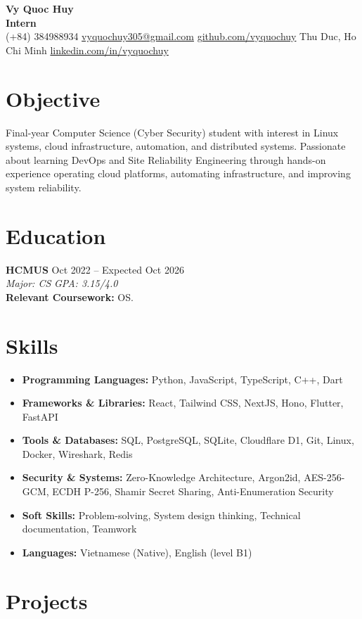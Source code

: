 \documentclass[10pt,a4paper]{article}
\begin{document}
\pagestyle{empty}

\begin{center}
    {\huge \textbf{Vy Quoc Huy}} \\ \vspace{4pt}
    {\Large \textbf{Intern}} \\ \vspace{4pt}
    (+84) 384988934 \quad \href{mailto:vyquochuy305@gmail.com}{vyquochuy305@gmail.com} \quad \href{https://github.com/vyquochuy}{github.com/vyquochuy} \quad Thu Duc, Ho Chi Minh \quad \href{https://www.linkedin.com/in/vyquochuy/}{linkedin.com/in/vyquochuy}
\end{center}

\section*{Objective}
Final-year Computer Science (Cyber Security) student with interest in Linux systems, cloud infrastructure, automation, and distributed systems. Passionate about learning DevOps and Site Reliability Engineering through hands-on experience operating cloud platforms, automating infrastructure, and improving system reliability.

\section*{Education}
\noindent \textbf{HCMUS} \hfill Oct 2022 -- Expected Oct 2026\\
\textit{Major: CS} \hfill \textit{GPA: 3.15/4.0}\\
\textbf{Relevant Coursework:} OS.

\section*{Skills}
\begin{itemize}[leftmargin=0.15in, label={}, itemsep=0pt]
    \item \textbf{Programming Languages:} Python, JavaScript, TypeScript, C++, Dart
    \item \textbf{Frameworks \& Libraries:} React, Tailwind CSS, NextJS, Hono, Flutter, FastAPI
    \item \textbf{Tools \& Databases:} SQL, PostgreSQL, SQLite, Cloudflare D1, Git, Linux, Docker, Wireshark, Redis
    \item \textbf{Security \& Systems:} Zero-Knowledge Architecture, Argon2id, AES-256-GCM, ECDH P-256, Shamir Secret Sharing, Anti-Enumeration Security
    \item \textbf{Soft Skills:} Problem-solving, System design thinking, Technical documentation, Teamwork
    \item \textbf{Languages:} Vietnamese (Native), English (level B1)
\end{itemize}

\section*{Projects}
\end{document}
